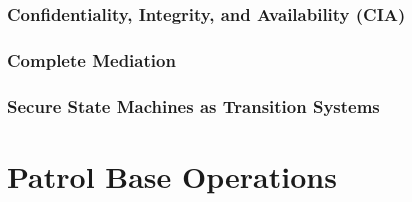 \documentclass[../../main/main.tex]{subfiles}
\begin{document}
\subsubsection{Confidentiality, Integrity, and Availability (CIA) }\label{sssect:ssmts}


\subsubsection{Complete Mediation}\label{sssec:strommediate}

\subsubsection{Secure State Machines as Transition Systems }\label{sssect:ssmts}

\section{Patrol Base Operations}\label{sec:stormpb}
\end{document}
